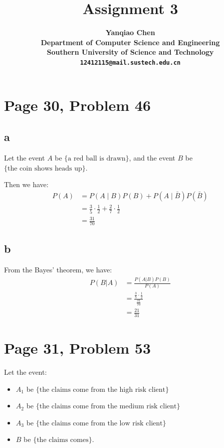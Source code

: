 \documentclass[a4paper, UTF-8]{article}
\theoremstyle{plain}
\begin{document}
\title{\bf{Assignment 3}}

\author{\bf{Yanqiao Chen}\\ 
  Department of Computer Science and Engineering\\
  Southern University of Science and Technology\\
  \texttt{12412115@mail.sustech.edu.cn}
  }


\maketitle

\section{Page 30, Problem 46}

\subsection{a}

Let the event $A$ be $\{\text{a red ball is drawn}\}$, and the event $B$ be $\{\text{the coin shows heads up}\}$.

Then we have:
\begin{align*}
P(A) &= P(A\mid B)P(B) + P(A\mid \bar{B})P(\bar{B})\\
     &= \frac{3}{5}\cdot \frac{1}{2} + \frac{2}{7}\cdot \frac{1}{2} \\
     &= \frac{31}{70}
\end{align*}

\subsection{b}

From the Bayes' theorem, we have:
\begin{align*}
P(B|A) &= \frac{P(A|B)P(B)}{P(A)} \\
       &= \frac{\frac{3}{5}\cdot \frac{1}{2}}{\frac{31}{70}} \\
       &= \frac{21}{31}
\end{align*}

\section{Page 31, Problem 53}

Let the event: 

\begin{itemize}

\item $A_1$ be $\{\text{the claims come from the high risk client}\}$
\item $A_2$ be $\{\text{the claims come from the medium risk client}\}$
\item $A_3$ be $\{\text{the claims come from the low risk client}\}$
\item $B$ be $\{\text{the claims comes}\}$.
\end{itemize}
\end{document}
